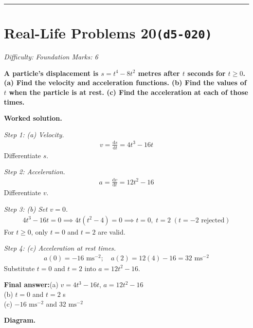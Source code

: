 \documentclass[11pt]{article}
\newcommand{\question}[1]{\par\medskip\noindent\textbf{#1}\par}
\begin{document}
\medskip\hrule

\section*{Real-Life Problems 20\quad\small\texttt{(d5-020)}}
\textit{Difficulty: Foundation \quad\textbar\quad Marks: 6}

\question{A particle's displacement is \( s = t^4 - 8t^2 \) metres after \( t \) seconds for \( t \geq 0 \). (a) Find the velocity and acceleration functions. (b) Find the values of \( t \) when the particle is at rest. (c) Find the acceleration at each of those times.}

\textbf{Worked solution.}

\textit{Step 1: (a) Velocity.}
\[\begin{gathered}
v = \frac{\mathrm{d}s}{\mathrm{d}t} = 4t^3 - 16t
\end{gathered}\]
Differentiate \( s \).

\textit{Step 2: Acceleration.}
\[\begin{gathered}
a = \frac{\mathrm{d}v}{\mathrm{d}t} = 12t^2 - 16
\end{gathered}\]
Differentiate \( v \).

\textit{Step 3: (b) Set \( v = 0 \).}
\[\begin{gathered}
4t^3 - 16t = 0 \implies 4t(t^2 - 4) = 0 \implies t = 0, \; t = 2 \; (t = -2 \text{ rejected})
\end{gathered}\]
For \( t \geq 0 \), only \( t = 0 \) and \( t = 2 \) are valid.

\textit{Step 4: (c) Acceleration at rest times.}
\[\begin{gathered}
a(0) = -16 \text{ ms}^{-2}; \quad a(2) = 12(4) - 16 = 32 \text{ ms}^{-2}
\end{gathered}\]
Substitute \( t = 0 \) and \( t = 2 \) into \( a = 12t^2 - 16 \).

\begin{answerbox}
\textbf{Final answer:}\quad (a) \(\displaystyle  v = 4t^3 - 16t \), \(\displaystyle  a = 12t^2 - 16 \) \\[3pt]  (b) \(\displaystyle  t = 0 \) and \(\displaystyle  t = 2 \) s \\[3pt]  (c) \(\displaystyle  -16 \text{ ms}^{-2} \) and \(\displaystyle  32 \text{ ms}^{-2} \)
\end{answerbox}
\textbf{Diagram.}
\end{document}
